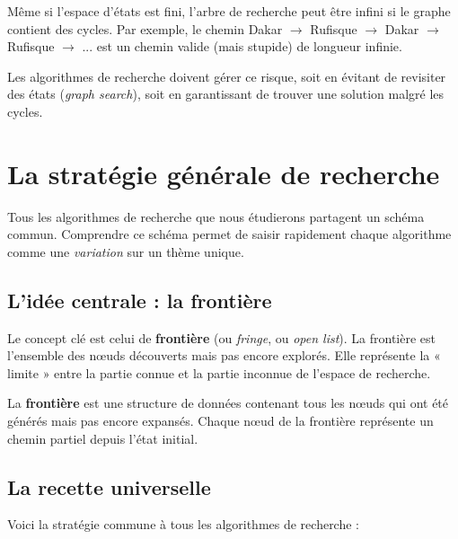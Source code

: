 \documentclass[11pt,a4paper]{article}
\begin{document}
\begin{attentionbox}
Même si l'espace d'états est fini, l'arbre de recherche peut être infini si le graphe contient des cycles. Par exemple, le chemin Dakar $\rightarrow$ Rufisque $\rightarrow$ Dakar $\rightarrow$ Rufisque $\rightarrow$ ... est un chemin valide (mais stupide) de longueur infinie.

Les algorithmes de recherche doivent gérer ce risque, soit en évitant de revisiter des états (\textit{graph search}), soit en garantissant de trouver une solution malgré les cycles.
\end{attentionbox}

\section{La stratégie générale de recherche}

Tous les algorithmes de recherche que nous étudierons partagent un schéma commun. Comprendre ce schéma permet de saisir rapidement chaque algorithme comme une \textit{variation} sur un thème unique.

\subsection{L'idée centrale : la frontière}

Le concept clé est celui de \textbf{frontière} (ou \textit{fringe}, ou \textit{open list}). La frontière est l'ensemble des nœuds découverts mais pas encore explorés. Elle représente la « limite » entre la partie connue et la partie inconnue de l'espace de recherche.

\begin{definitionbox}
La \textbf{frontière} est une structure de données contenant tous les nœuds qui ont été générés mais pas encore expansés. Chaque nœud de la frontière représente un chemin partiel depuis l'état initial.
\end{definitionbox}

\subsection{La recette universelle}

Voici la stratégie commune à tous les algorithmes de recherche :
\end{document}
